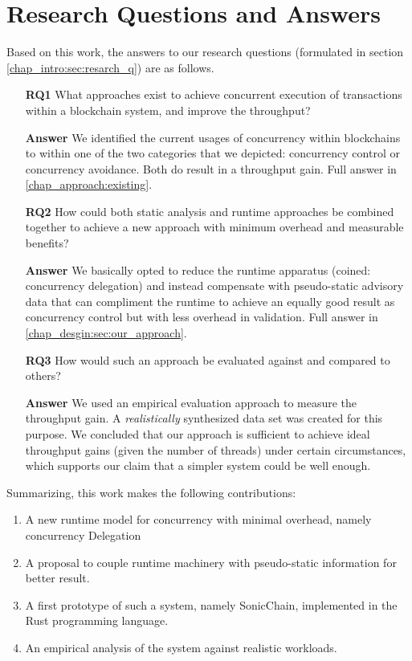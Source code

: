 \section{Research Questions and Answers} \label{chap_conc:sec:rq}

Based on this work, the answers to our research questions (formulated in
section \ref{chap_intro:sec:resarch_q}) are as follows.

\begin{enumerate}
	\item [\textbf{RQ1}] What approaches exist to achieve concurrent execution of transactions
	within a blockchain system, and improve the throughput?

	\item [\textbf{Answer}] We identified the current usages of concurrency within blockchains to
	within one of the two categories that we depicted: concurrency control or concurrency avoidance.
	Both do result in a throughput gain. Full answer in \ref{chap_approach:existing}.

	\item [\textbf{RQ2}] How could both static analysis and runtime approaches be combined together
	to achieve a new approach with minimum overhead and measurable benefits?

	\item [\textbf{Answer}] We basically opted to reduce the runtime apparatus (coined: concurrency
	delegation) and instead compensate with pseudo-static advisory data that can compliment the
	runtime to achieve an equally good result as concurrency control but with less overhead in validation. Full answer in \ref{chap_desgin:sec:our_approach}.

	\item [\textbf{RQ3}] How would such an approach be evaluated against and compared to others?

	\item [\textbf{Answer}] We used an empirical evaluation approach to measure the throughput gain.
	A \textit{realistically} synthesized data set was created for this purpose. We concluded that
	our approach is sufficient to achieve ideal throughput gains (given the number of threads) under
	certain circumstances, which supports our claim that a simpler system could be well enough.
\end{enumerate}

Summarizing, this work makes the following contributions:
\begin{enumerate}
    \item A new runtime model for concurrency with minimal overhead, namely concurrency Delegation
    \item A proposal to couple runtime machinery with pseudo-static information for better result.
    \item A first prototype of such a system, namely SonicChain, implemented in the Rust programming
    language.
    \item An empirical analysis of the system against realistic workloads.
\end{enumerate}

